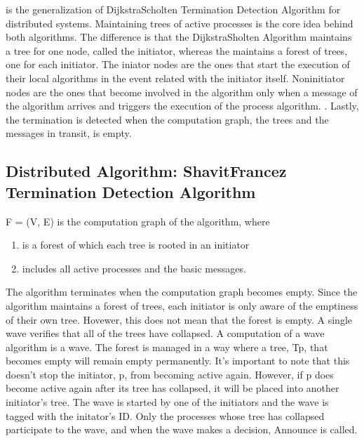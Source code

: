 \documentclass[letterpaper,10pt,english]{sphinxmanual}
\begin{document}
\sphinxAtStartPar
{\hyperref[\detokenize{docs/ShavitFrancezAlg/algorithm:shavitfranchesterminationdetectionalgorithm}]{}}  is the generalization of Dijkstra\sphinxhyphen{}Scholten  Termination Detection Algorithm for distributed systems. Maintaining trees of active processes is the core idea behind both algorithms. The difference is that the Dijkstra\sphinxhyphen{}Sholten Algorithm maintains a tree for one node, called the initiator, whereas the {\hyperref[\detokenize{docs/ShavitFrancezAlg/algorithm:shavitfranchesterminationdetectionalgorithm}]{}} maintains a forest of trees, one for each initiator. The iniator nodes are the ones that start the execution of their local algorithms in the event related with the initiator itself. Non\sphinxhyphen{}initiator nodes are the ones that become involved in the algorithm only when a message of the algorithm arrives and triggers the execution of the process algorithm. . Lastly, the termination is detected when the computation graph, the trees and the messages in transit, is empty.


\subsection{Distributed Algorithm: Shavit\sphinxhyphen{}Francez Termination Detection Algorithm}
\label{\detokenize{docs/ShavitFrancezAlg/algorithm:distributed-algorithm-shavitfrancezalg}}
\sphinxAtStartPar
F = (V, E) is the computation graph of the algorithm, where
\begin{enumerate}
%
\item {} 
\sphinxAtStartPar
{} is a forest of which each tree is rooted in an initiator

\item {} 
\sphinxAtStartPar
{} includes all active processes and the basic messages.

\end{enumerate}

\sphinxAtStartPar
The algorithm terminates when the computation graph becomes empty. Since the algorithm maintains a forest of trees, each initiator is only aware of the emptiness of their own tree. Hovewer, this does not mean that the forest is empty. A single wave verifies that all of the trees have collapsed. A computation of a wave algorithm is a wave. The forest is  managed in a way where a tree, Tp, that becomes empty will remain empty permanently. It’s important to note that this doesn’t stop the initiator, p, from becoming active again. However, if p does become active again after its tree has collapsed, it will be placed into another initiator’s tree. The wave is started by one of the initiators and the wave is tagged with the initator’s ID. Only the processes whose tree has collapsed participate to the wave, and when the wave makes a decision, Announce is called.
\end{document}
